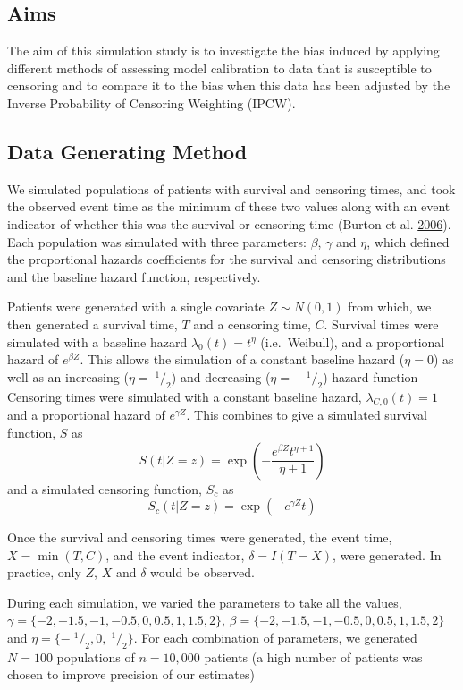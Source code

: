 \documentclass[
]{article}
\newcommand{\sfrac}[2]{\;^{#1}/_{#2}}
\begin{document}
\hypertarget{aims}{%
\subsection{Aims}\label{aims}}

The aim of this simulation study is to investigate the bias induced by applying different methods of assessing model calibration to data that is susceptible to censoring and to compare it to the bias when this data has been adjusted by the Inverse Probability of Censoring Weighting (IPCW).

\hypertarget{data-generating-method}{%
\subsection{Data Generating Method}\label{data-generating-method}}

We simulated populations of patients with survival and censoring times, and took the observed event time as the minimum of these two values along with an event indicator of whether this was the survival or censoring time (Burton et al. \protect\hyperlink{ref-burton_design_2006}{2006}). Each population was simulated with three parameters: \(\beta\), \(\gamma\) and \(\eta\), which defined the proportional hazards coefficients for the survival and censoring distributions and the baseline hazard function, respectively.

Patients were generated with a single covariate \(Z \sim N(0,1)\) from which, we then generated a survival time, \(T\) and a censoring time, \(C\). Survival times were simulated with a baseline hazard \(\lambda_0(t) = t^{\eta}\) (i.e.~Weibull), and a proportional hazard of \(e^{\beta Z}\). This allows the simulation of a constant baseline hazard (\(\eta = 0\)) as well as an increasing (\(\eta = \sfrac{1}{2}\)) and decreasing (\(\eta = -\sfrac{1}{2}\)) hazard function Censoring times were simulated with a constant baseline hazard, \(\lambda_{C,0}(t) = 1\) and a proportional hazard of \(e^{\gamma Z}\). This combines to give a simulated survival function, \(S\) as
\[
S(t|Z=z) = \exp\left(-\frac{e^{\beta Z}t^{\eta+1}}{\eta+1}\right)
\]
and a simulated censoring function, \(S_c\) as
\[
S_c(t|Z=z) = \exp\left(-e^{\gamma Z}t\right)
\]

Once the survival and censoring times were generated, the event time, \(X = \min(T,C)\), and the event indicator, \(\delta = I(T=X)\), were generated. In practice, only \(Z\), \(X\) and \(\delta\) would be observed.

During each simulation, we varied the parameters to take all the values,\(\gamma = \{-2,-1.5,-1,-0.5,0,0.5,1,1.5,2\}\), \(\beta = \{-2,-1.5,-1,-0.5,0,0.5,1,1.5,2\}\) and \(\eta = \{-\sfrac{1}{2},0,\sfrac{1}{2}\}\). For each combination of parameters, we generated \(N = 100\) populations of \(n = 10,000\) patients (a high number of patients was chosen to improve precision of our estimates)
\end{document}
